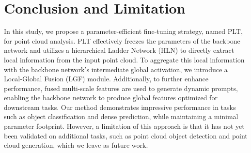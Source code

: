 \section{Conclusion and Limitation}
\label{sec:conclusion&limitation}
In this study, we propose a parameter-efficient fine-tuning strategy, named PLT, for point cloud analysis. PLT effectively freezes the parameters of the backbone network and utilizes a hierarchical Ladder Network (HLN) to directly extract local information from the input point cloud. To aggregate this local information with the backbone network’s intermediate global activation, we introduce a Local-Global Fusion (LGF) module. Additionally, to further enhance performance, fused multi-scale features are used to generate dynamic prompts, enabling the backbone network to produce global features optimized for downstream tasks. Our method demonstrates impressive performance in tasks such as object classification and dense prediction, while maintaining a minimal parameter footprint. However, a limitation of this approach is that it has not yet been validated on additional tasks, such as point cloud object detection and point cloud generation, which we leave as future work.